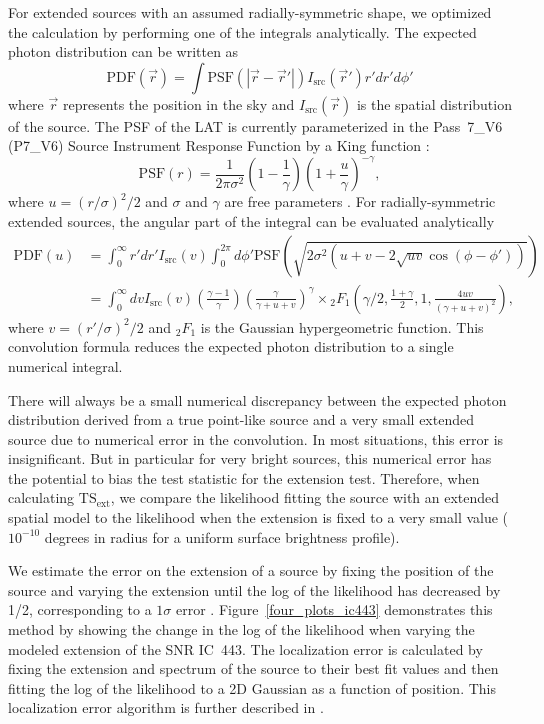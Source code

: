 \documentclass[12pt,preprint]{aastex}
\newcommand{\tsext}{{\ensuremath{\text{TS}_{\text{ext}}}}\xspace}
\begin{document}
For extended sources with an assumed radially-symmetric shape,
we optimized the calculation by performing one
of the integrals analytically.
The expected photon 
distribution can be written as
\begin{equation}
  \text{PDF}(\vec r) = \int  \text{PSF}(|\vec r - \vec r'|)I_\text{src}(\vec r') r' dr' d\phi'
\end{equation}
where $\vec r$ represents the position in the sky and
$I_\text{src}(\vec r)$ is the spatial distribution of the
source.
The PSF of the LAT is currently parameterized 
in the Pass~7\_V6 (P7\_V6) Source Instrument
Response Function \citep[IRFs,][]{lat_on_orbit_psf} by a King function \citep{king_function}:
\begin{equation}
  \text{PSF}(r) = 
  \frac{1}{2\pi\sigma^2}
  \left(1-\frac{1}{\gamma}\right)
  \left(1+\frac{u}{\gamma}\right)^{-\gamma},
\end{equation}
where $u=(r/\sigma)^2/2$ and $\sigma$ and $\gamma$ are free parameters
\citep{matthew_kerr_thesis}.  For radially-symmetric extended sources,
the angular part of the integral can be evaluated analytically
\begin{align}
  \text{PDF}(u) & = \int_0^\infty r' dr'
  I_\text{src}(v) 
  \int_0^{2\pi} d\phi' 
  \text{PSF}(\sqrt{2\sigma^2(u+v-2\sqrt{uv}\cos(\phi-\phi'))})
  \\
  & = \int_0^\infty dv
  I_\text{src}(v) 
  \left(\frac{\gamma-1}{\gamma}\right)
  \left( \frac{\gamma}{\gamma + u + v}\right)^\gamma 
  \times {}_2F_1 \left(\gamma/2,\frac{1+\gamma}{2},1,\frac{4uv}{(\gamma+u+v)^2}\right),
\end{align}
where $v=(r'/\sigma)^2/2$ and ${}_2F_1$ is the Gaussian hypergeometric
function.  This convolution formula reduces the expected photon
distribution to a single numerical integral.

There will always be a small numerical discrepancy between the expected
photon distribution derived from a true point-like source and a very small
extended source due to numerical error in the convolution.  In most
situations, this error is insignificant.  But in particular for
very bright sources, this numerical error has the potential to bias the
test statistic for the extension test. Therefore, when calculating
\tsext, we compare the likelihood fitting the source with an extended
spatial model to the likelihood when the extension is
fixed to a very small value ($10^{-10}$ degrees in radius 
for a uniform surface brightness profile).

We estimate the error on the extension of a source by fixing
the position of the source and varying the extension until the
log of the likelihood has decreased by 1/2, corresponding to a $1\sigma$ error
\citep{Statistical_methods_book}.  Figure~\ref{four_plots_ic443}
demonstrates this method by showing the change in the log of the
likelihood when 
varying the modeled extension of the SNR IC~443.  The localization
error is calculated by fixing the extension and spectrum of the source
to their best fit values and then
fitting the log of the likelihood to
a 2D Gaussian as a function
of position. This localization error algorithm is further described in
\cite{second_cat}.
\end{document}
